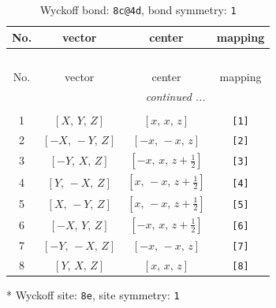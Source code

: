 \documentclass[fleqn,8pt]{jsarticle}
\begin{document}
\renewcommand{\arraystretch}{1.2}
\begin{longtable}{cccc}
\caption{Wyckoff bond: {\tt 8c@4d}, bond symmetry: {\tt 1}}
 \\
 \hline \hline
No. & vector & center & mapping \\ \hline \endfirsthead

\multicolumn{3}{l}{\tablename\ \thetable{}} \\
 \hline \hline
No. & vector & center & mapping \\ \hline \endhead

 \hline \hline
\multicolumn{3}{r}{\footnotesize\it continued ...} \\ \endfoot

 \hline \hline
\multicolumn{3}{r}{} \\ \endlastfoot

1 & $\left[ X,\, Y,\, Z \right]$ & $\left[ x,\, x,\, z \right]$ & {\tt [1]} \\ \hline
2 & $\left[ - X,\, - Y,\, Z \right]$ & $\left[ - x,\, - x,\, z \right]$ & {\tt [2]} \\ \hline
3 & $\left[ - Y,\, X,\, Z \right]$ & $\left[ - x,\, x,\, z + \frac{1}{2} \right]$ & {\tt [3]} \\ \hline
4 & $\left[ Y,\, - X,\, Z \right]$ & $\left[ x,\, - x,\, z + \frac{1}{2} \right]$ & {\tt [4]} \\ \hline
5 & $\left[ X,\, - Y,\, Z \right]$ & $\left[ x,\, - x,\, z + \frac{1}{2} \right]$ & {\tt [5]} \\ \hline
6 & $\left[ - X,\, Y,\, Z \right]$ & $\left[ - x,\, x,\, z + \frac{1}{2} \right]$ & {\tt [6]} \\ \hline
7 & $\left[ - Y,\, - X,\, Z \right]$ & $\left[ - x,\, - x,\, z \right]$ & {\tt [7]} \\ \hline
8 & $\left[ Y,\, X,\, Z \right]$ & $\left[ x,\, x,\, z \right]$ & {\tt [8]} \\
\end{longtable}
* Wyckoff site: {\tt 8e}, site symmetry: {\tt 1}
\renewcommand{\arraystretch}{1.2}
\end{document}

